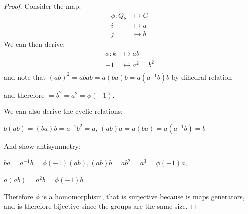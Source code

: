 \documentclass[../Main.tex]{subfiles}
\begin{document}
\begin{proof}
    Consider the map:
    \begin{align*}
        \phi : Q_8 &\mapsto G \\
        i &\mapsto a \\
        j &\mapsto b
    \end{align*}
    We can then derive:
    \begin{align*}
        \phi : k &\mapsto ab \\
        -1 &\mapsto a^2 = b^2 \\
    \end{align*}
    and note that $(ab)^2 = abab = a(ba)b = a(a^{-1}b)b$ by dihedral relation\par
    and therefore $= b^2 = a^2 = \phi(-1)$.\par
    We can also derive the cyclic relations:\par
    $b(ab) = (ba)b = a^{-1}b^2 = a$, $(ab)a = a(ba) = a(a^{-1}b) = b$\par
    And show antisymmetry:\par
    $ba = a^{-1}b = \phi(-1)(ab), (ab)b = a b^2 = a^3 = \phi(-1)a$,\par
    $a(ab) = a^2 b = \phi(-1)b$.\par
    Therefore $\phi$ is a homomorphism, that is surjective because is maps generators, and is therefore bijective since the groups are the same size.
\end{proof}
\end{document}
